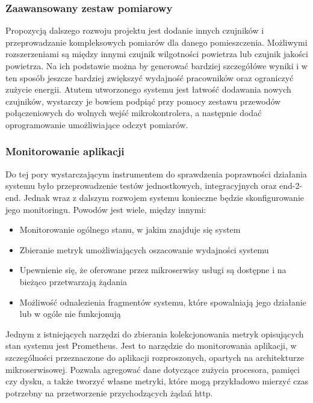 \subsubsection{Zaawansowany zestaw pomiarowy}

Propozycją dalszego rozwoju projektu jest dodanie innych czujników i przeprowadzanie
kompleksowych pomiarów dla danego pomieszczenia. Możliwymi rozszerzeniami są między
innymi czujnik wilgotności powietrza lub czujnik jakości powietrza. Na ich podstawie
można by generować bardziej szczegółówe wyniki i w ten sposób jeszcze bardziej
zwiększyć wydajność pracowników oraz ograniczyć zużycie energii. Atutem utworzonego
systemu jest łatwość dodawania nowych czujników, wystarczy je bowiem podpiąć 
przy pomocy zestawu przewodów połączeniowych do wolnych wejść mikrokontrolera, a następnie dodać
oprogramowanie umożliwiające odczyt pomiarów. 

\subsubsection{Monitorowanie aplikacji}

Do tej pory wystarczającym instrumentem do sprawdzenia poprawności działania systemu
było przeprowadzenie testów jednostkowych, integracyjnych oraz end-2-end. Jednak
wraz z dalszym rozwojem systemu konieczne będzie skonfigurowanie jego monitoringu.
Powodów jest wiele, między innymi:

\begin{itemize}
    \item Monitorowanie ogólnego stanu, w jakim znajduje się system
    \item Zbieranie metryk umożliwiających oszacowanie wydajności systemu
    \item Upewnienie się, że oferowane przez mikroserwisy usługi są dostępne i na bieżąco przetwarzają żądania
    \item Możliwość odnalezienia fragmentów systemu, które spowalniają jego działanie
    lub w ogóle nie funkcjonują
\end{itemize}

Jednym z istniejących narzędzi do zbierania kolekcjonowania metryk opisujących
stan systemu jest Prometheus\cite{prometheus2022}. Jest to narzędzie do monitorowania
aplikacji, w szczególności przeznaczone do aplikacji rozproszonych, opartych na
architekturze mikroserwisowej. Pozwala agregować dane dotyczące zużycia procesora,
pamięci czy dysku, a także tworzyć własne metryki, które mogą przykładowo mierzyć
czas potrzebny na przetworzenie przychodzących żądań http.